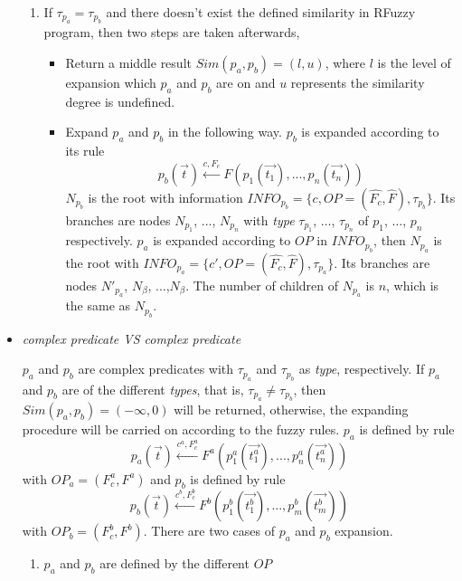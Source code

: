 \begin{itemize}
\begin{enumerate}
    \item If $\tau_{p_a} = \tau_{p_b}$ and there doesn't exist the defined similarity in RFuzzy program, then two steps are taken afterwards,
    \begin{itemize}
     \item Return a middle result $Sim(p_a,p_b)=(l,u)$, where $l$ is the level of expansion which $p_a$ and $p_b$ are on and $u$ represents the similarity degree is undefined.
     \item Expand $p_a$ and $p_b$ in the following way.
    $p_b$ is expanded according to its rule
    \[p_b(\vec{t}) \stackrel{c,F_c}{\longleftarrow}F(p_1(\vec{t_1}),...,p_n(\vec{t_n}))\]
    $N_{p_b}$ is the root with information $INFO_{p_b} = \{c,OP=(\hat{F_c},\hat{F}),\tau_{p_b}\}$. Its branches are nodes $N_{p_1}$, ..., $N_{p_n}$ with \textit{type} $\tau_{p_1}$, $\dots$, $\tau_{p_n}$ of $p_1$, $\dots$, $p_n$ respectively.
    $p_a$ is expanded according to $OP$ in $INFO_{p_b}$, then $N_{p_a}$ is the root with $INFO_{p_a} = \{c',OP=(\hat{F_c},\hat{F}),\tau_{p_a}\}$. Its branches are nodes $N'_{p_a}$, $N_{\beta}$, ...,$N_{\beta}$. The number of children of $N_{p_a}$ is $n$, which is the same as $N_{p_b}$.
   \end{itemize}


   \end{enumerate}
 
 \item \textit{complex predicate VS complex predicate}

   $p_a$ and $p_b$ are complex predicates with $\tau_{p_a}$ and $\tau_{p_b}$ as \textit{type}, respectively. If $p_a$ and $p_b$ are of the different \textit{types}, that is, $\tau_{p_a} \neq \tau_{p_b}$, then $Sim(p_a, p_b)=(-\infty,0)$ will be returned, otherwise, the expanding procedure will be carried on according to the fuzzy rules.
    $p_a$ is defined by rule
    \[p_a(\vec{t}) \stackrel{c^a,F_c^a}{\longleftarrow}F^a(p_1^a(\vec{t_1^a}),...,p_n^a(\vec{t_n^a}))\]
    with $OP_a=(F_c^a,F^a)$
    and $p_b$ is defined by rule
    \[p_b(\vec{t}) \stackrel{c^b,F_c^b}{\longleftarrow}F^b(p_1^b(\vec{t_1^b}),...,p_m^b(\vec{t_m^b}))\]
    with $OP_b=(F_c^b,F^b)$. There are two cases of $p_a$ and $p_b$ expansion.
   \begin{enumerate}
    \item $p_a$ and $p_b$ are defined by the different $OP$
     

\end{enumerate}
\end{itemize}
